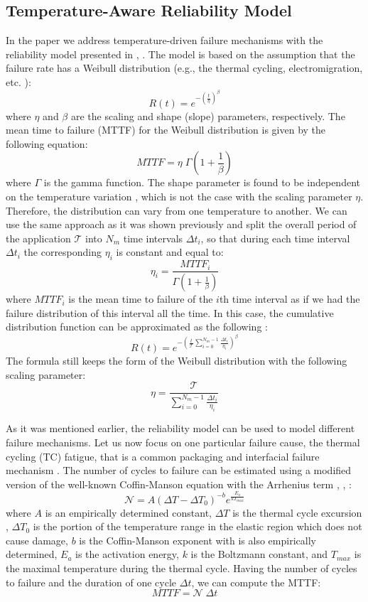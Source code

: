 \subsection{Temperature-Aware Reliability Model} \label{sec:reliability-model}
In the paper we address temperature-driven failure mechanisms with the reliability model presented in \cite{huang2009}, \cite{xiang2010}. The model is based on the assumption that the failure rate has a Weibull distribution (e.g., the thermal cycling, electromigration, etc. \cite{jedec2010}):
\[
  R(t) = e^{-(\frac{t}{\eta})^\beta}
\]
where $\eta$ and $\beta$ are the scaling and shape (slope) parameters, respectively. The mean time to failure (MTTF) for the Weibull distribution is given by the following equation:
\begin{equation} \label{eq:general-mttf}
  MTTF = \eta \; \Gamma(1 + \frac{1}{\beta})
\end{equation}
where $\Gamma$ is the gamma function. The shape parameter is found to be independent on the temperature variation \cite{chang2006}, which is not the case with the scaling parameter $\eta$. Therefore, the distribution can vary from one temperature to another. We can use the same approach as it was shown previously and split the overall period of the application $\mathcal{T}$ into $N_m$ time intervals $\Delta t_i$, so that during each time interval $\Delta t_i$ the corresponding $\eta_i$ is constant and equal to:
\[
  \eta_i = \frac{MTTF_i}{\Gamma(1 + \frac{1}{\beta})}
\]
where $MTTF_i$ is the mean time to failure of the $i$th time interval as if we had the failure distribution of this interval all the time. In this case, the cumulative distribution function can be approximated as the following \cite{xiang2010}:
\[
  R(t) = e^{-(\frac{t}{\mathcal{T}} \sum_{i=0}^{N_m - 1} \frac{\Delta t_i}{\eta_i})^\beta}
\]
The formula still keeps the form of the Weibull distribution with the following scaling parameter:
\[
  \eta = \frac{\mathcal{T}}{\sum_{i=0}^{N_m - 1} \frac{\Delta t_i}{\eta_i}}
\]

As it was mentioned earlier, the reliability model can be used to model different failure mechanisms. Let us now focus on one particular failure cause, the thermal cycling (TC) fatigue, that is a common packaging and interfacial failure mechanism \cite{jedec2010}. The number of cycles to failure can be estimated using a modified version of the well-known Coffin-Manson equation with the Arrhenius term \cite{jedec2010}, \cite{xiang2010}, \cite{ciappa2003}:
\begin{equation} \label{eq:cycles-to-failure}
  \mathcal{N} = A (\Delta T - \Delta T_0)^{-b} e^{\frac{E_a}{k T_{max}}}
\end{equation}
where $A$ is an empirically determined constant, $\Delta T$ is the thermal cycle excursion \cite{ciappa2003}, $\Delta T_0$ is the portion of the temperature range in the elastic region which does not cause damage, $b$ is the Coffin-Manson exponent with is also empirically determined, $E_{a}$ is the activation energy, $k$ is the Boltzmann constant, and $T_{max}$ is the maximal temperature during the thermal cycle. Having the number of cycles to failure and the duration of one cycle $\Delta t$, we can compute the MTTF:
\[
  MTTF = \mathcal{N} \; \Delta t
\]

